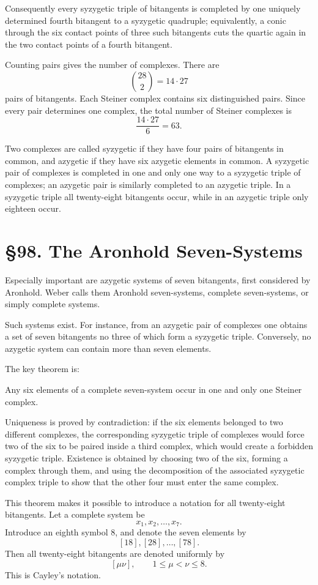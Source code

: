 \documentclass[12pt,a4paper]{article}
\newcommand{\webersection}[2]{\section*{\S #1. #2}\addcontentsline{toc}{section}{\S #1. #2}}
\begin{document}
Consequently every syzygetic triple of bitangents is completed by one uniquely determined fourth bitangent to a syzygetic quadruple; equivalently, a conic through the six contact points of three such bitangents cuts the quartic again in the two contact points of a fourth bitangent.

Counting pairs gives the number of complexes.  There are
\[
\binom{28}{2}=14\cdot27
\]
pairs of bitangents.  Each Steiner complex contains six distinguished pairs.  Since every pair determines one complex, the total number of Steiner complexes is
\[
\frac{14\cdot27}{6}=63.
\]

Two complexes are called syzygetic if they have four pairs of bitangents in common, and azygetic if they have six azygetic elements in common.  A syzygetic pair of complexes is completed in one and only one way to a syzygetic triple of complexes; an azygetic pair is similarly completed to an azygetic triple.  In a syzygetic triple all twenty-eight bitangents occur, while in an azygetic triple only eighteen occur.

\webersection{98}{The Aronhold Seven-Systems}

Especially important are azygetic systems of seven bitangents, first considered by Aronhold.  Weber calls them Aronhold seven-systems, complete seven-systems, or simply complete systems.

Such systems exist.  For instance, from an azygetic pair of complexes one obtains a set of seven bitangents no three of which form a syzygetic triple.  Conversely, no azygetic system can contain more than seven elements.

The key theorem is:

Any six elements of a complete seven-system occur in one and only one Steiner complex.

Uniqueness is proved by contradiction: if the six elements belonged to two different complexes, the corresponding syzygetic triple of complexes would force two of the six to be paired inside a third complex, which would create a forbidden syzygetic triple.  Existence is obtained by choosing two of the six, forming a complex through them, and using the decomposition of the associated syzygetic complex triple to show that the other four must enter the same complex.

This theorem makes it possible to introduce a notation for all twenty-eight bitangents.  Let a complete system be
\[
x_1,x_2,\ldots,x_7.
\]
Introduce an eighth symbol \(8\), and denote the seven elements by
\[
[18],[28],\ldots,[78].
\]
Then all twenty-eight bitangents are denoted uniformly by
\[
[\mu\nu],\qquad 1\le \mu<\nu\le8.
\]
This is Cayley's notation.
\end{document}
